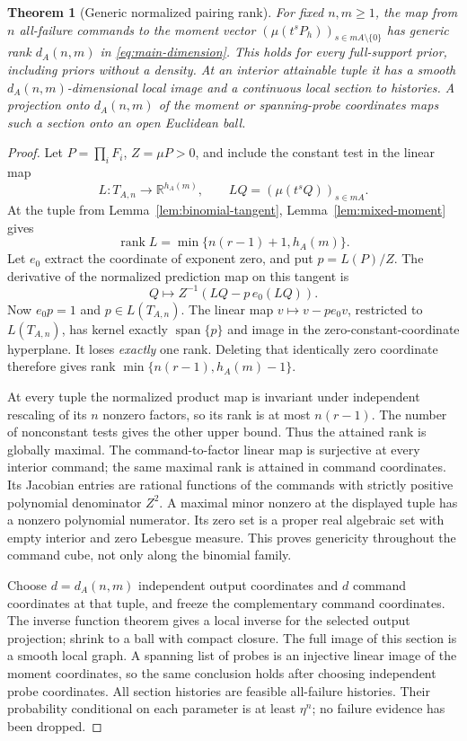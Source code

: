 \documentclass[11pt]{amsart}
\newtheorem{theorem}{Theorem}[section]
\theoremstyle{definition}\newtheorem{definition}[theorem]{Definition}
\theoremstyle{remark}\newtheorem{remark}[theorem]{Remark}
\newcommand{\R}{\mathbb R}\newcommand{\N}{\mathbb N}\newcommand{\C}{\mathbb C}
\DeclareMathOperator{\spanop}{span}\DeclareMathOperator{\rank}{rank}
\begin{document}
\begin{theorem}[Generic normalized pairing rank]\label{thm:rank}
For fixed $n,m\ge1$, the map from $n$ all-failure commands to the moment
vector $(\mu(t^sP_h))_{s\in mA\setminus\{0\}}$ has generic rank
$d_A(n,m)$ in \eqref{eq:main-dimension}. This holds for every full-support
prior, including priors without a density. At an interior attainable tuple
it has a smooth $d_A(n,m)$-dimensional local image and a continuous local
section to histories. A projection onto $d_A(n,m)$ of the moment or
spanning-probe coordinates maps such a section onto an open Euclidean ball.
\end{theorem}
\begin{proof}
Let $P=\prod_iF_i$, $Z=\mu P>0$, and include the constant test in the
linear map
\[
 L:T_{A,n}\longrightarrow\R^{h_A(m)},\qquad
 LQ=(\mu(t^sQ))_{s\in mA}.
\]
At the tuple from Lemma~\ref{lem:binomial-tangent},
Lemma~\ref{lem:mixed-moment} gives
\[
 \rank L=\min\{n(r-1)+1,h_A(m)\}.
\]
Let $e_0$ extract the coordinate of exponent zero, and put $p=L(P)/Z$.
The derivative of the normalized prediction map on this tangent is
\begin{equation}\label{eq:normalized-derivative}
 Q\longmapsto Z^{-1}(LQ-p\,e_0(LQ)).
\end{equation}
Now $e_0p=1$ and $p\in L(T_{A,n})$. The linear map
$v\mapsto v-p e_0v$, restricted to $L(T_{A,n})$, has kernel exactly
$\spanop\{p\}$ and image in the zero-constant-coordinate hyperplane.
It loses \emph{exactly} one rank. Deleting that identically zero coordinate
therefore gives rank $\min\{n(r-1),h_A(m)-1\}$.

At every tuple the normalized product map is invariant under independent
rescaling of its $n$ nonzero factors, so its rank is at most $n(r-1)$.
The number of nonconstant tests gives the other upper bound. Thus the
attained rank is globally maximal. The command-to-factor linear map is
surjective at every interior command; the same maximal rank is attained
in command coordinates. Its Jacobian entries are rational functions of
the commands with strictly positive polynomial denominator $Z^2$.
A maximal minor nonzero at the displayed tuple has a nonzero polynomial
numerator. Its zero set is a proper real algebraic set with empty interior
and zero Lebesgue measure. This proves genericity throughout the command
cube, not only along the binomial family.

Choose $d=d_A(n,m)$ independent output coordinates and $d$ command
coordinates at that tuple, and freeze the complementary command
coordinates. The inverse function theorem gives a local inverse for the
selected output projection; shrink to a ball with compact closure.
The full image of this section is a smooth local graph. A spanning list
of probes is an injective linear image of the moment coordinates, so the
same conclusion holds after choosing independent probe coordinates.
All section histories are feasible all-failure histories. Their probability
conditional on each parameter is at least $\eta^n$; no failure evidence
has been dropped.
\end{proof}
\end{document}
